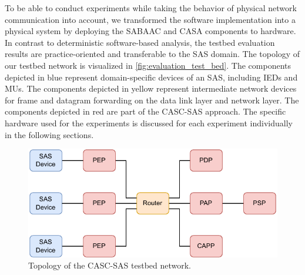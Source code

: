To be able to conduct experiments while taking the behavior of physical network communication into account, we transformed the software implementation into a physical system by deploying the SABAAC and CASA components to hardware.
In contrast to deterministic software-based analysis, the testbed evaluation results are practice-oriented and transferable to the SAS domain.
The topology of our testbed network is visualized in \autoref{fig:evaluation_test_bed}.
The components depicted in blue represent domain-specific devices of an SAS, including IEDs and MUs.
The components depicted in yellow represent intermediate network devices for frame and datagram forwarding on the data link layer and network layer.
The components depicted in red are part of the CASC-SAS approach.
The specific hardware used for the experiments is discussed for each experiment individually in the following sections.
\begin{figure}
    \centering
    \includegraphics[width=0.8\linewidth]{figures/network_testbed_color.drawio.pdf}
    \caption{Topology of the CASC-SAS testbed network.}
    \label{fig:evaluation_test_bed}
\end{figure}
%

